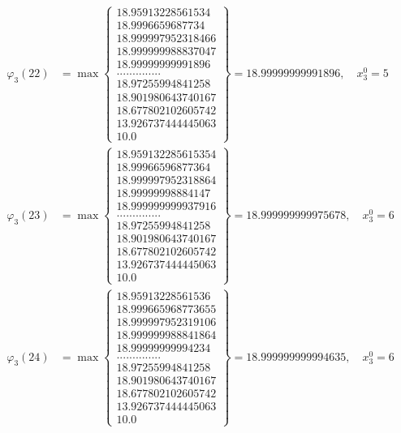 \documentclass{article}
\begin{document}
\begin{align*}
  
  
  
\varphi_{3}(22) &= \max \left\{ \begin{array}{c}
18.95913228561534 \\
 18.9996659687734 \\
 18.999997952318466 \\
 18.999999988837047 \\
 18.99999999991896 \\
 .............. \\
 18.97255994841258 \\
 18.901980643740167 \\
 18.677802102605742 \\
 13.926737444445063 \\
 10.0
\end{array} \right\} = 18.99999999991896, \quad x_{3}^0 = 5\\
  
  
  
  
\varphi_{3}(23) &= \max \left\{ \begin{array}{c}
18.959132285615354 \\
 18.99966596877364 \\
 18.999997952318864 \\
 18.99999998884147 \\
 18.999999999937916 \\
 .............. \\
 18.97255994841258 \\
 18.901980643740167 \\
 18.677802102605742 \\
 13.926737444445063 \\
 10.0
\end{array} \right\} = 18.999999999975678, \quad x_{3}^0 = 6\\
  
  
  
  
\varphi_{3}(24) &= \max \left\{ \begin{array}{c}
18.95913228561536 \\
 18.999665968773655 \\
 18.999997952319106 \\
 18.999999988841864 \\
 18.99999999994234 \\
 .............. \\
 18.97255994841258 \\
 18.901980643740167 \\
 18.677802102605742 \\
 13.926737444445063 \\
 10.0
\end{array} \right\} = 18.999999999994635, \quad x_{3}^0 = 6\\
  

\end{align*}
\end{document}
